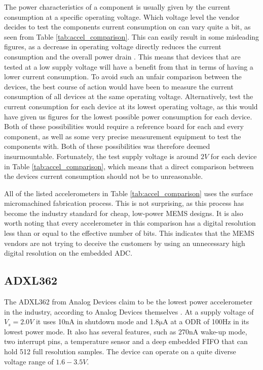 The power characteristics of a component is usually given by the current consumption at a specific operating voltage. Which voltage level the vendor decides to test the components current consumption on can vary quite a bit, as seen from Table \ref{tab:accel_comparison}. This can easily result in some misleading figures, as a decrease in operating voltage directly reduces the current consumption and the overall power drain \cite[~p.3]{holberg06}. This means that devices that are tested at a low supply voltage will have a benefit from that in terms of having a lower current consumption. To avoid such an unfair comparison between the devices, the best course of action would have been to measure the current consumption of all devices at the same operating voltage. Alternatively, test the current consumption for each device at its lowest operating voltage, as this would have given us figures for the lowest possible power consumption for each device. Both of these possibilities would require a reference board for each and every component, as well as some very precise measurement equipment to test the components with. Both of these possibilities was therefore deemed insurmountable. Fortunately, the test supply voltage is around $2V$ for each device in Table \ref{tab:accel_comparison}, which means that a direct comparison between the devices current consumption should not be to unreasonable. 

All of the listed accelerometers in Table \ref{tab:accel_comparison} uses the surface micromachined fabrication process. This is not surprising, as this process has become the industry standard for cheap, low-power MEMS designs. It is also worth noting that every accelerometer in this comparison has a digital resolution less than or equal to the effective number of bits. This indicates that the MEMS vendors are not trying to deceive the customers by using an unnecessary high digital resolution on the embedded ADC.

\subsection{ADXL362}

The ADXL362 from Analog Devices claim to be the lowest power accelerometer in the industry, according to Analog Devices themselves \cite{analog12}. At a supply voltage of $V_s = 2.0 V$ it uses 10nA in shutdown mode and 1.8$\si{\micro\ampere}$ at a ODR of 100Hz in its lowest power mode. It also has several features, such as 270nA wake-up mode, two interrupt pins, a temperature sensor and a deep embedded FIFO that can hold 512 full resolution samples. The device can operate on a quite diverse voltage range of $1.6-3.5V$.

